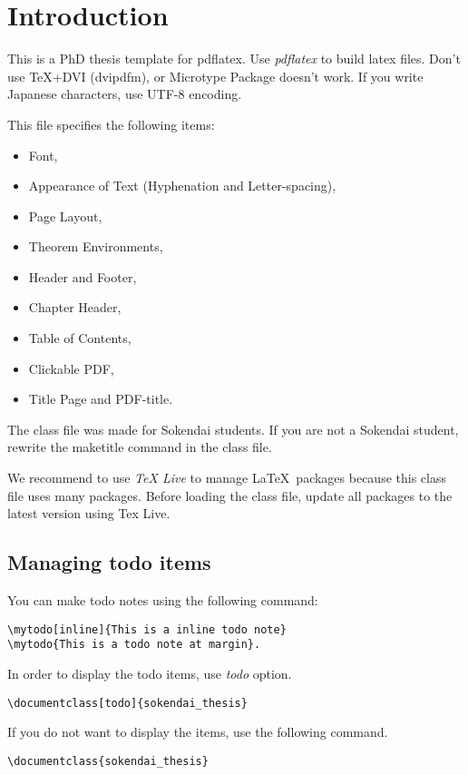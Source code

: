 \chapter{Introduction}\label{chapter:introduction}

\graphicspath{{Manuscript/Introduction/Figs/}}

This is a PhD thesis template for pdflatex.
Use \textit{pdflatex} to build latex files.
Don't use TeX+DVI (dvipdfm), or Microtype Package doesn't work.
If you write Japanese characters, use UTF-8 encoding. 

This file specifies the following items:
\begin{itemize}
	\item Font,
	\item Appearance of Text (Hyphenation and Letter-spacing),
	\item Page Layout,
	\item Theorem Environments,
	\item Header and Footer,
	\item Chapter Header,
	\item Table of Contents,
	\item Clickable PDF,
	\item Title Page and PDF-title.
\end{itemize}

The class file was made for Sokendai students.
If you are not a Sokendai student, rewrite the maketitle command in the class file.

We recommend to use \textit{TeX Live} to manage \LaTeX ~packages because this class file uses many packages. 
Before loading the class file, update all packages to the latest version using Tex Live.


\section{Managing todo items}
\makeatletter
\newcommand{\verbatimfont}[1]{\def\verbatim@font{#1}}%
\makeatother
\verbatimfont{\rmfamily}

You can make todo notes using the following command:
\begin{verbatim}
\mytodo[inline]{This is a inline todo note} 
\mytodo{This is a todo note at margin}.
\end{verbatim}

In order to display the todo items, use \textit{todo} option.
\begin{verbatim}
\documentclass[todo]{sokendai_thesis}
\end{verbatim}

If you do not want to display the items,
use the following command.
\begin{verbatim}
\documentclass{sokendai_thesis}
\end{verbatim}




